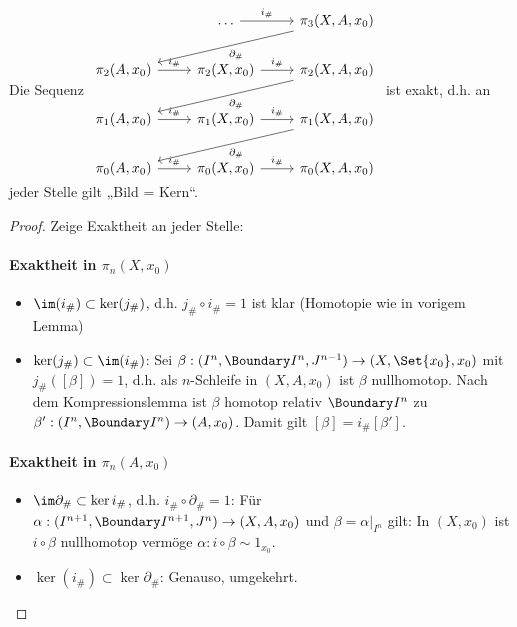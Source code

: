 \begin{st}
    Die Sequenz
    \begin{math}
        \begin{tikzcd}
            & \dotsc \ar[r,"i_\#"] & \pi_3(X, A, x_0) \ar[dll,"\partial_\#"] \\
            \pi_2(A,x_0) \ar[r,"i_\#"] & \pi_2(X, x_0) \ar[r,"i_\#"] & \pi_2(X, A, x_0) \ar[dll,"\partial_\#"] \\
            \pi_1(A,x_0) \ar[r,"i_\#"] & \pi_1(X, x_0) \ar[r,"i_\#"] & \pi_1(X, A, x_0) \ar[dll,"\partial_\#"] \\
            \pi_0(A,x_0) \ar[r,"i_\#"] & \pi_0(X, x_0) \ar[r,"i_\#"] & \pi_0(X, A, x_0)
        \end{tikzcd}
    \end{math}
    ist exakt, d.h. an jeder Stelle gilt „Bild = Kern“.
    \begin{proof}
        Zeige Exaktheit an jeder Stelle:
        \paragraph{Exaktheit in $\pi_n(X,x_0)$}
        \begin{itemize}
            \item
                $\im(i_\#) \subset \ker(j_\#)$, d.h. $j_\# \circ i_\# = 1$ ist klar (Homotopie wie in vorigem Lemma)
            \item
                $\ker(j_\#) \subset \im(i_\#)$:
                Sei $\beta: (I^n, \Boundary I^n, J^{n-1}) \to (X, \Set{x_0}, x_0)$ mit $j_\#([\beta]) = 1$, d.h. als $n$-Schleife in $(X, A, x_0)$ ist $\beta$ nullhomotop.
                Nach dem Kompressionslemma ist $\beta$ homotop relativ $\Boundary I^n$ zu $\beta': (I^n, \Boundary I^n) \to (A, x_0)$.
                Damit gilt $[\beta] = i_\# [\beta']$.
        \end{itemize}
        \paragraph{Exaktheit in $\pi_n(A, x_0)$}
        \begin{itemize}
            \item
                $\im \partial_\# \subset \ker i_\#$, d.h. $i_\# \circ \partial_\# = 1$:
                Für $\alpha: (I^{n+1}, \Boundary I^{n+1}, J^n) \to (X, A, x_0)$ und $\beta = \alpha|_{I^n}$ gilt:
                In $(X, x_0)$ ist $i \circ \beta$ nullhomotop vermöge $\alpha: i \circ \beta \sim 1_{x_0}$.
            \item
                $\ker(i_\#) \subset \ker \partial_\#$:
                Genauso, umgekehrt.
        \end{itemize}

\end{proof}
\end{st}
